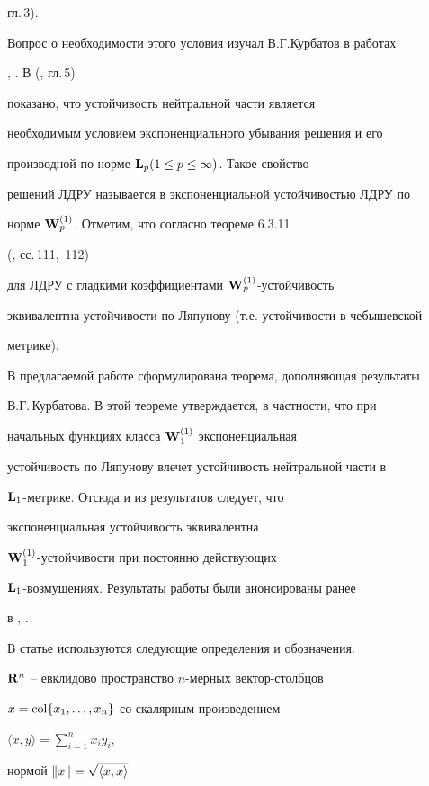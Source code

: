 гл.\,3).


Вопрос о необходимости этого условия изучал В.Г.Курбатов в работах


\cite{Ku1}, \cite{Ku2}. В (\cite{Ku3}, гл.\,5)


показано, что устойчивость нейтральной части является


необходимым условием экспоненциального убывания решения и его


производной по норме $\bold L_p(1\le p\le\infty)$. Такое свойство


решений ЛДРУ называется в \cite{Ku3} экспоненциальной устойчивостью ЛДРУ по


норме $\bold W_p^{(1)}$. Отметим, что согласно теореме 6.3.11


(\cite{Ku3}, сс.\,111,~112)


для ЛДРУ с гладкими коэффициентами $\bold W_p^{(1)}$-устойчивость


эквивалентна устойчивости по Ляпунову (т.е. устойчивости в чебышевской


метрике).





В предлагаемой работе сформулирована теорема, дополняющая результаты


В.Г.\,Курбатова. В этой теореме утверждается, в частности, что при


начальных функциях класса $\bold W_1^{(1)}$ экспоненциальная


устойчивость по Ляпунову влечет устойчивость нейтральной части в


$\bold L_1$-метрике. Отсюда и из результатов \cite{Ku3} следует, что


экспоненциальная устойчивость эквивалентна 


$\bold W_1^{(1)}$-устойчивости при постоянно действующих 


$\bold L_1$-возмущениях. Результаты работы были анонсированы ранее


в \cite{Si1}, \cite{Si2}.





В статье используются следующие определения и обозначения.


$\bold R^n$ -- евклидово пространство $n$-мерных вектор-столбцов


$x=\operatorname{col}\{x_1,\dotsc,x_n\}$ со скалярным произведением


$\langle x,y\rangle=\sum\limits_{i=1}^nx_iy_i$,


нормой $\|x\|=\sqrt{\smash[b]{\langle x,x\rangle}}$



